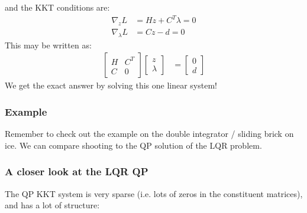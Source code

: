 and the KKT conditions are:
\begin{align}
    \nabla_z L &= H z + C^T \lambda = 0 \\
    \nabla_{\lambda} L &= C z - d = 0
\end{align}
This may be written as:
\begin{align}
    \begin{bmatrix}
        H & C^T \\
        C & 0
    \end{bmatrix}
    \begin{bmatrix}
        z \\
        \lambda
    \end{bmatrix}
    &=
    \begin{bmatrix}
        0 \\
        d
    \end{bmatrix}
\end{align}
We get the exact answer by solving this one linear system!

\subsubsection{Example}
Remember to check out the example on the double integrator / sliding brick on ice. We can compare shooting to the QP solution of the LQR problem.

\subsubsection{A closer look at the LQR QP}
The QP KKT system is very sparse (i.e. lots of zeros in the constituent matrices), and has a lot of structure:


